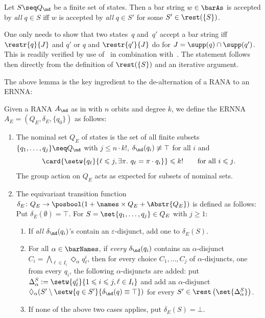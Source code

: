 \documentclass[10pt, final, conference, a4paper, twocolumn]{IEEEtran}
\begin{document}
\begin{lem}\label{lem:correst}
  Let $S \seq Q_{\nd}$ be a finite set of states. Then a bar string $w \in \barAs$
  is accepted by \emph{all} $q \in S$ iff $w$ is accepted by \emph{all} $q \in S'$
  for some $S' \in \rest(\{S\})$.
\end{lem}
\begin{IEEEproof}
  One only needs to show that two states~$q$ and~$q'$ accept a bar string iff $\restr{q}{J}$
  and $q'$ or $q$ and $\restr{q'}{J}$ do for $J = \supp(q) \cap \supp(q')$. This
  is readily verified by use of~ in combination with~. The
  statement follows then directly from the definition of $\rest(\{S\})$ and an iterative
  argument.
\end{IEEEproof}
The above lemma is the key ingredient to the de-alternation of a RANA to an  ERNNA:

\begin{construction}\label{constr:dealt}
  Given a RANA $A_{\nd}$ as in 
  with $n$ orbits and degree $k$, we define the ERNNA $A_E=(Q_E,\delta_E,\{q_0\})$ as follows:
  \begin{enumerate}
    \item The nominal set $Q_E$ of states is the set of all finite subsets 
    $\{q_1,\ldots,q_j\}\seq Q_{\nd}$ with $j \leqslant n \cdot k!$, $\delta_{\nd}(q_i) \not\equiv \top$
    for all $i$ and
    \[ 
      \card{\setw{q_\ell}{\ell \leqslant j, \exists \pi.\ q_\ell = \pi \cdot q_i}} \leqslant k!
      \qquad\text{for all $i \leqslant j$}.
    \]
    The
      group action on $Q_E$ acts as expected for subsets of nominal sets.
    \item The equivariant transition function $\delta_E \colon Q_E \to \posbool(1 + \names \times Q_E + \Abstr{Q_E})$ is defined
      as follows: Put $\delta_E(\emptyset) = \top$.
      For $S = \set{q_1, \dots, q_j} \in Q_E$ with $j \geqslant 1$:
      \begin{enumerate}
        \item If \emph{all} $\delta_{\nd}(q_i)$'s contain an $\varepsilon$-disjunct, add one to
          $\delta_E(S)$. %
        \item For all $\alpha \in \barNames$, if \emph{every} $\delta_{\nd}(q_i)$ contains an $\alpha$-disjunct $C_i = \bigwedge_{\ell \in I_i} \Diamond_{\alpha} q^i_\ell$, then for every choice $C_1, \ldots, C_j$ of $\alpha$-disjuncts, one from every $q_i$, the following $\alpha$-disjuncts are added:
          put \(\Delta_\alpha^S := \setw{q^i_\ell}{1 \leqslant i \leqslant j, \ell \in I_i}\) and add an $\alpha$-disjunct $\Diamond_{\alpha} (S' \setminus \setw{q \in S'}{\delta_{\nd}(q) \equiv \top})$ for every $S' \in \rest\left(\set{\Delta_\alpha^S}\right)$.
        \item If none of the above two cases applies, put $\delta_E(S) = \bot$.
      \end{enumerate}
  \end{enumerate}
\end{construction}
\end{document}
